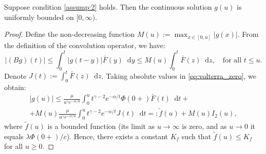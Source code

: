 \documentclass[smallextended]{svjour3}
\providecommand{\diff}{\mathop{}\!\mathrm{d}}
\begin{document}
\begin{lemma}\label{lem:boundedness}
Suppose condition \ref{assump:2} holds. Then the continuous solution $g(u)$ is uniformly bounded on $[0,\infty)$.
\end{lemma}
\begin{proof}
Define the non-decreasing function $M(u) := \max_{x \in [0,u]} |g(x)|$. From the definition of the convolution operator, we have:
\[
|(Bg)(t)| \le \int_0^t |g(t-y)| \bar F(y) \diff y \le M(u) \int_0^t \bar F(z) \diff z, \quad \text{for all } t \le u.
\]
Denote $J(t) := \int_0^t \bar F(z) \diff z$. Taking absolute values in \eqref{eq:volterra_zero}, we obtain:
\begin{multline*}
|g(u)| \le \frac{\mu}{u^\gamma e^{-\alpha/u}} \int_0^u t^{\gamma-2} e^{-\alpha/t} \Phi(0+)\bar F(t) \diff t +
\\
+ M(u) \frac{\mu}{u^\gamma e^{-\alpha/u}} \int_0^u t^{\gamma-2} e^{-\alpha/t} J(t) \diff t =: \tilde f(u) + M(u) I_2(u),
\end{multline*}
where $\tilde f(u)$ is a bounded function (its limit as $u\to\infty$ is zero, and as $u\to 0$ it equals $\lambda\Phi(0+)/c$). Hence, there exists a constant $K_f$ such that $\tilde f(u) \le K_f$ for all $u\ge0$.


\end{proof}
\end{document}
